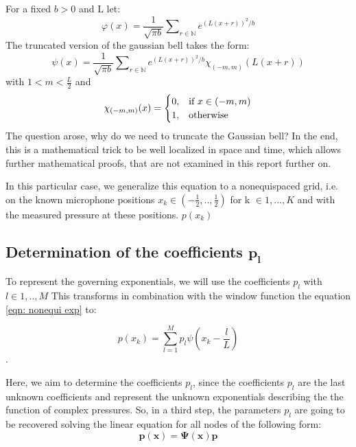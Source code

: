 \documentclass[11pt]{report} %
\begin{document}
For a fixed $b>0$ and L let:
\begin{equation}
\varphi(x)= \frac{1}{\sqrt{\pi b}} \sum\nolimits_{r \in \mathbb{N}}  e^{(L(x+r))^2/b}
\end{equation}
The truncated version of the gaussian bell takes the form: 
\begin{equation}
\psi(x)= \frac{1}{\sqrt{\pi b}} \sum\nolimits_{r \in \mathbb{N}}  e^{(L(x+r))^2/b}\chi_{(-m,m)}(L(x+r))
\end{equation}
with $1<m < \frac{L}{2}$ and
\begin{equation}
    \chi_{(-m,m)}(x)=
    \begin{cases}
      0, & \text{if}\ x\in (-m,m) \\
      1, & \text{otherwise}
    \end{cases}\notag
\end{equation} 
The question arose, why do we need to truncate the Gaussian bell? In the end, this is a mathematical trick to be well localized in space and time, which allows further mathematical proofs, that are not examined in this report further on.

In this particular case, we generalize this equation to a nonequispaced grid, i.e. on the known microphone positions $x_{k}\in (-\frac{1}{2},..,\frac{1}{2})$ for k $\in{1,..., K}$ and with the measured pressure at these positions.  $p(x_{k}) $


\subsection{Determination of the coefficients $\bm{p_l}$}
To represent the governing exponentials, we will use the coefficients $p_l$ with $l \in{1,..,M}$    
This transforms in combination with the window function the equation \eqref{eqn: nonequi exp} to: 

\begin{equation}
p(x_{k})=\sum\limits_{l=1}^M p_{l}\psi(x_{k}-\frac{l}{L})\label{eqn: linear system}
\end{equation}.

Here, we aim to determine the coefficients $p_l$, since the coefficients $p_l$ are the last unknown coefficients and represent the unknown exponentials describing the the function of complex pressures.
So, in a third step, the parameters $p_l$ are going to be recovered solving the linear equation for all nodes of the following form: 
\begin{equation}
\bm{p(x)} = \bm{\Psi (x)} \bm{p}
\end{equation}
\end{document}
